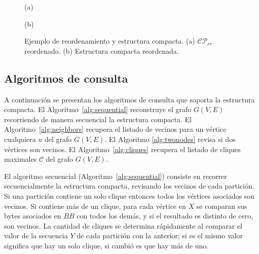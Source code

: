 \begin{figure}
	\centering
	\begin{minipage}{0.45\textwidth}
		\centering
		
	
		(a)
	\end{minipage}
	\begin{minipage}{0.45\textwidth}
		\centering
		
		
		(b)
	\end{minipage}
	
	\caption{Ejemplo de reordenamiento y estructura compacta. (a) $\mathcal{C}\mathcal{P}_{rr}$ reordenado. (b) Estructura compacta reordenada.}
	\label{fig:compactStructure}
\end{figure}



\subsection{Algoritmos de consulta}
A continuación se presentan los algoritmos de consulta que soporta la estructura compacta. El Algoritmo~\ref{alg:sequential} reconstruye el grafo $G(V, E)$ recorriendo de manera secuencial la estructura compacta. El Algoritmo~\ref{alg:neighbors} recupera el listado de vecinos para un vértice cualquiera $u$ del grafo $G(V, E)$. El Algoritmo \ref{alg:twonodes} revisa si dos vértices son vecinos. El Algoritmo~\ref{alg:cliques} recupera el listado de cliques maximales $\mathcal{C}$ del grafo $G(V, E)$.

El algoritmo secuencial (Algoritmo~\ref{alg:sequential}) consiste en recorrer secuencialmente la estructura compacta, revisando los vecinos de cada partición. Si una partición contiene un solo clique entonces todos los vértices asociados son vecinos. Si contiene más de un clique, para cada vértice en $X$ se comparan sus bytes asociados en $BB$ con todos los demás, y si el resultado es distinto de cero, son vecinos. La cantidad de cliques se determina rápidamente al comparar el valor de la secuencia $Y$ de cada partición con la anterior; si es el mismo valor significa que hay un solo clique, si cambió es que hay más de uno.

